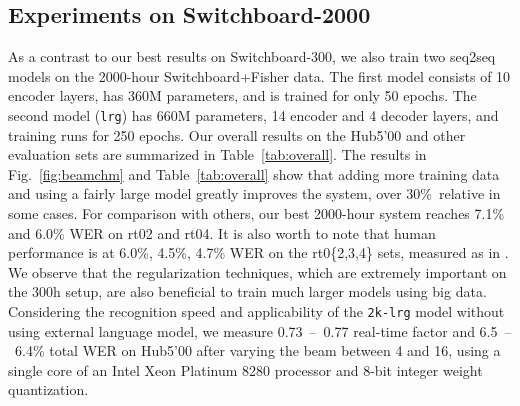 \documentclass[a4paper]{article}
\begin{document}
\subsection{Experiments on Switchboard-2000}
\vspace{-.15mm}
As a contrast to our best results on Switchboard-300, we also train two seq2seq models on the 2000-hour Switchboard+Fisher data.
The first model consists of 10 encoder layers, has 360M parameters, and is trained for only 50 epochs.
The second model (\texttt{lrg}) has 660M parameters, 14 encoder and 4 decoder layers, and training runs for 250 epochs.
Our overall results on the Hub5'00 and other evaluation sets are summarized in Table~\ref{tab:overall}.
The results in Fig.~\ref{fig:beamchm} and Table~\ref{tab:overall} show that adding more training data and using a fairly large model greatly improves the system, over 30\%~relative in some cases.
For comparison with others, our best 2000-hour system reaches 7.1\% and 6.0\% WER on rt02 and rt04.
It is also worth to note that human performance is at 6.0\%, 4.5\%, 4.7\% WER on the rt0\{2,3,4\} sets, measured as in \cite{Saon2017}.
We observe that the regularization techniques, which are extremely important on the 300h setup, are also beneficial to train much larger models using big data.
Considering the recognition speed and applicability of the \texttt{2k-lrg} model without using external language model, we measure 0.73~--~0.77 real-time factor and 6.5~--~6.4\% total WER on Hub5'00 after varying the beam between 4 and 16, using a single core of an Intel Xeon Platinum 8280 processor and 8-bit integer weight quantization.
\end{document}
